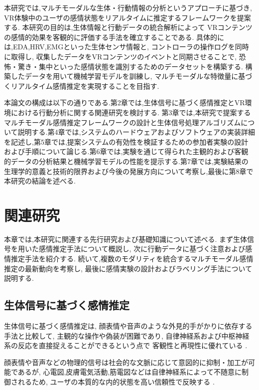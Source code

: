 \documentclass[book,paper=a4,fontsize=10pt,jafontscale=0.92]{jlreq}
\begin{document}
本研究では,マルチモーダルな生体・行動情報の分析というアプローチに基づき,
VR体験中のユーザの感情状態をリアルタイムに推定するフレームワークを提案する.
本研究の目的は,生体情報と行動データの統合解析によって
VRコンテンツの感情的効果を客観的に評価する手法を確立することである.
具体的には,EDA,HRV,EMGといった生体センサ情報と,
コントローラの操作ログを同時に取得し,
収集したデータをVRコンテンツのイベントと同期させることで,
恐怖・驚き・集中といった感情状態を識別するためのデータセットを構築する.
構築したデータを用いて機械学習モデルを訓練し,
マルチモーダルな特徴量に基づくリアルタイム感情推定を実現することを目指す.

本論文の構成は以下の通りである.第2章では,生体信号に基づく感情推定とVR環境における行動分析に関する関連研究を検討する.
第3章では,本研究で提案するマルチモーダル感情推定フレームワークの設計と生体信号処理アルゴリズムについて説明する.第4章では,システムのハードウェアおよびソフトウェアの実装詳細を記述し,第5章では,提案システムの有効性を検証するための参加者実験の設計および手順について論じる.第6章では,実験を通じて得られた主観的および客観的データの分析結果と機械学習モデルの性能を提示する.第7章では,実験結果の生理学的意義と技術的限界および今後の発展方向について考察し,最後に第8章で本研究の結論を述べる.

\chapter{関連研究}

本章では,本研究に関連する先行研究および基礎知識について述べる.
まず生体信号を用いた感情推定手法について概説し,
次に行動データに基づく注意および感情推定手法を紹介する.
続いて,複数のモダリティを統合するマルチモーダル感情推定の最新動向を考察し,
最後に感情実験の設計およびラベリング手法について説明する.

\section{生体信号に基づく感情推定}

生体信号に基づく感情推定は,
顔表情や音声のような外見的手がかりに依存する手法と比較して,
主観的な操作や偽装が困難であり,
自律神経系および中枢神経系の反応を直接捉えることができるという点で
客観性と再現性に優れている \cite{MarinMorales2020}.

顔表情や音声などの物理的信号は社会的な文脈に応じて意図的に抑制・加工が可能であるが,
心電図,皮膚電気活動,筋電図などは自律神経系によって不随意に制御されるため,
ユーザの本質的な内的状態を高い信頼性で反映する \cite{Shu2018}.   
\end{document}
